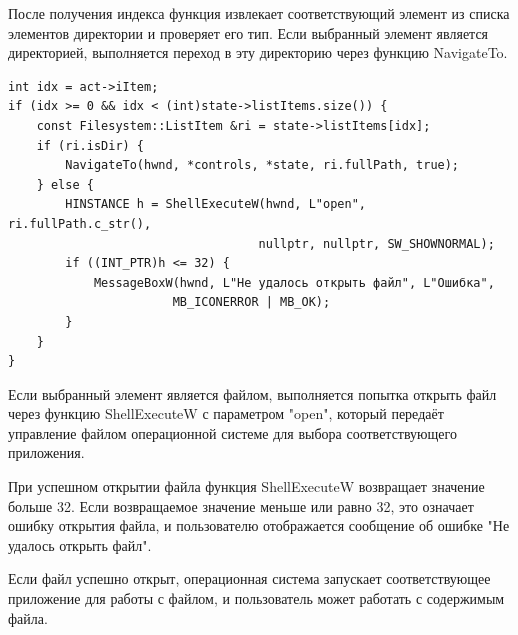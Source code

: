 После получения индекса функция извлекает соответствующий
элемент из списка элементов директории и проверяет его тип.
Если выбранный элемент является директорией, выполняется
переход в эту директорию через функцию NavigateTo.

\begin{lstlisting}[style=CodeListing]
int idx = act->iItem;
if (idx >= 0 && idx < (int)state->listItems.size()) {
    const Filesystem::ListItem &ri = state->listItems[idx];
    if (ri.isDir) {
        NavigateTo(hwnd, *controls, *state, ri.fullPath, true);
    } else {
        HINSTANCE h = ShellExecuteW(hwnd, L"open", ri.fullPath.c_str(), 
                                   nullptr, nullptr, SW_SHOWNORMAL);
        if ((INT_PTR)h <= 32) {
            MessageBoxW(hwnd, L"Не удалось открыть файл", L"Ошибка", 
                       MB_ICONERROR | MB_OK);
        }
    }
}
\end{lstlisting}

Если выбранный элемент является файлом, выполняется попытка
открыть файл через функцию ShellExecuteW с параметром "open",
который передаёт управление файлом операционной системе для
выбора соответствующего приложения.

При успешном открытии файла функция ShellExecuteW возвращает
значение больше 32. Если возвращаемое значение меньше или
равно 32, это означает ошибку открытия файла, и пользователю
отображается сообщение об ошибке "Не удалось открыть файл".

Если файл успешно открыт, операционная система запускает
соответствующее приложение для работы с файлом, и
пользователь может работать с содержимым файла.